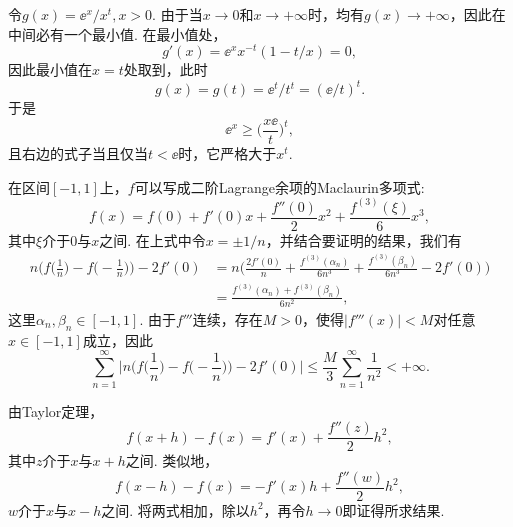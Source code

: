 \begin{ans}
  令$g(x)=\ee^x/x^t,x>0$. 由于当$x\to0$和$x\to+\infty$时，均有$g(x)\to+\infty$，因此在中间必有一个最小值. 在最小值处，
  \[ g'(x)=\ee^xx^{-t}(1-t/x)=0, \]
  因此最小值在$x=t$处取到，此时
  \[ g(x)=g(t)=\ee^t/t^t=(\ee/t)^t. \]
  于是
  \[ \ee^x \ge \Big(\frac{x\ee}t \Big)^t, \]
  且右边的式子当且仅当$t<\ee$时，它严格大于$x^t$.
\end{ans}

\begin{ans}
  在区间$[-1,1]$上，$f$可以写成二阶Lagrange余项的Maclaurin多项式:
  \[
    f(x)=f(0)+f'(0)x+\frac{f''(0)}2x^2+\frac{f^{(3)}(\xi)}6x^3,
  \]
  其中$\xi$介于$0$与$x$之间. 在上式中令$x=\pm1/n$，并结合要证明的结果，我们有
  \begin{align*}
    n\bigg( f\Big(\frac1n\Big)-f\Big(-\frac1n\bigg) \Big)      -2f'(0)  & = n\bigg( \frac{2f'(0)}n+\frac{f^{(3)}(\alpha_n)}{6n^3}
    +\frac{f^{(3)}(\beta_n)}{6n^3}-2f'(0) \bigg)\\
    & = \frac{f^{(3)}(\alpha_n)+f^{(3)}(\beta_n)}{6n^2},
  \end{align*}
  这里$\alpha_n,\beta_n\in[-1,1]$. 由于$f'''$连续，存在$M>0$，使得$|f'''(x)|<M$对任意$x\in[-1,1]$成立，因此
  \[
    \sum_{n=1}^\infty\bigg|
    n\bigg( f\Big(\frac1n\Big)-f\Big(-\frac1n\Big) \bigg)      -2f'(0) \bigg|
    \le \frac M3\sum_{n=1}^\infty \frac1{n^2} <+\infty.
  \]
\end{ans}

\begin{ans}
  由Taylor定理，
  \[ f(x+h)-f(x)=f'(x)+\frac{f''(z)}2h^2, \]
  其中$z$介于$x$与$x+h$之间. 类似地，
  \[ f(x-h)-f(x)=-f'(x)h+\frac{f''(w)}2h^2, \]
  $w$介于$x$与$x-h$之间. 将两式相加，除以$h^2$，再令$h\to0$即证得所求结果.
\end{ans}

